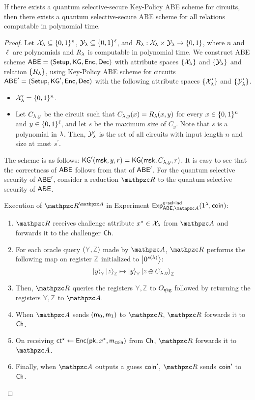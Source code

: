 \begin{lemma}\label{lma:kp_to_cp}
If there exists a quantum selective-secure Key-Policy ABE scheme
for circuits, then there exists a quantum selective-secure ABE scheme for all relations computable in polynomial time.
\end{lemma}
\begin{proof}
Let $\mathcal{X}_\lambda\subseteq\{0,1\}^n$, $\mathcal{Y}_\lambda\subseteq \{0,1\}^\ell$, and $R_\lambda:\mathcal{X}_\lambda\times\mathcal{Y}_\lambda\rightarrow\{0,1\}$, where $n$ and $\ell$ are polynomials and $R_\lambda$ is computable in polynomial time.
We construct ABE scheme $\mathsf{ABE} = (\mathsf{Setup},\mathsf{KG},\mathsf{Enc},\mathsf{Dec})$ with attribute spaces $\{\mathcal{X}_\lambda\}$ and $\{\mathcal{Y}_\lambda\}$ and relation $\{R_\lambda\}$, using Key-Policy ABE scheme for circuits $\mathsf{ABE}' =
(\mathsf{Setup},\mathsf{KG}',\mathsf{Enc},\mathsf{Dec})$ with the following attribute spaces $\{\mathcal{X}^\prime_\lambda\}$ and $\{\mathcal{Y}^\prime_\lambda\}$.
\begin{itemize}
\item $\mathcal{X}^\prime_\lambda=\{0,1\}^n$.
\item Let $C_{\lambda,y}$ be the circuit such that $C_{\lambda,y}(x)=R_\lambda(x,y)$ for every $x\in\{0,1\}^n$ and $y\in\{0,1\}^\ell$, and let $s$ be the maximum size of $C_y$. Note that $s$ is a polynomial in $\lambda$. Then, $\mathcal{Y}^\prime_\lambda$ is the set of all circuits with input length $n$ and size at most $s^\prime$.
\end{itemize}
The scheme is as follows:
$\mathsf{KG}'(\mathsf{msk}, y, r) = \mathsf{KG}(\mathsf{msk}, C_{\lambda,y}, r)$.
It is easy to see that the correctness of $\mathsf{ABE}$ follows from that of $\mathsf{ABE}^\prime$. For the
quantum selective security of $\mathsf{ABE}'$, consider a reduction $\qR$
to the quantum selective security of $\mathsf{ABE}$.

\begin{description}
\item Execution of $\qR^{\qA}$ in Experiment $\expc{\ABE,
\qA}{q}{sel}{ind}(1^\secp,\coin)$:
\begin{enumerate}
\item $\qR$ receives challenge attribute $x^* \in \mathcal{X}_\lambda$ from $\qA$ and
forwards it to the challenger $\mathsf{Ch}$.
\item For each oracle query $(\qreg{Y}, \qreg{Z})$ made by $\qA$,
$\qR$ performs the following map on
register $\qreg{Z}$ initialized to $\ket{0^{s(\lambda)}}$:
$$\ket{y}_{\qreg{Y}}\ket{z}_{\qreg{Z}} \mapsto
\ket{y}_{\qreg{Y}}\ket{z \xor C_{\secp,y}}_{\qreg{Z}}$$
\item Then, $\qR$ queries the registers $\qreg{Y}, \qreg{Z}$ to
$O_{\mathtt{qkg}}$ followed by returning the registers $\qreg{Y},
\qreg{Z}$ to $\qA$.
\item When $\qA$ sends $(\mathsf{m}_0, \mathsf{m}_1)$ to $\qR$, $\qR$ forwards it to
$\mathsf{Ch}$.
\item On receiving $\mathsf{ct}^\star \leftarrow \mathsf{Enc}(\mathsf{pk}, x^*, \mathsf{m}_{\mathsf{coin}})$ from
$\mathsf{Ch}$, $\qR$ forwards it to $\qA$.
\item Finally, when $\qA$ outputs a guess $\mathsf{coin}'$, $\qR$ sends
    $\mathsf{coin}'$ to $\mathsf{Ch}$.
\end{enumerate}
\end{description}


\end{proof}
